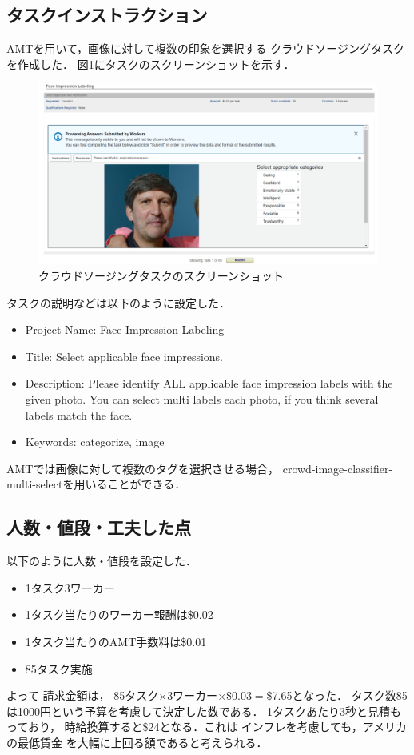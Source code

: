 \subsection{タスクインストラクション}
AMTを用いて，画像に対して複数の印象を選択する
クラウドソージングタスクを作成した．
図\ref{fig:ch2:task}にタスクのスクリーンショットを示す．
\begin{figure}[tb]
  \centering
  \includegraphics[width=12cm]{ch2/task.png}
  \caption{
  クラウドソージングタスクのスクリーンショット
  \label{fig:ch2:task}
  }
\end{figure}
タスクの説明などは以下のように設定した．
\begin{itemize}
  \item Project Name: Face Impression Labeling
  \item Title: Select applicable face impressions.
  \item Description: Please identify ALL applicable
  face impression labels with the given photo.
  You can select multi labels each photo, if you
  think several labels match the face.
  \item Keywords: categorize, image
\end{itemize}

AMTでは画像に対して複数のタグを選択させる場合，
crowd-image-classifier-multi-selectを用いることができる．

\subsection{人数・値段・工夫した点}
以下のように人数・値段を設定した．
\begin{itemize}
  \item 1タスク3ワーカー
  \item 1タスク当たりのワーカー報酬は\$0.02
  \item 1タスク当たりのAMT手数料は\$0.01
  \item 85タスク実施
\end{itemize}
よって
請求金額は，
85タスク$\times$3ワーカー$\times$\$0.03$=$\$7.65となった．
タスク数85は1000円という予算を考慮して決定した数である．
1タスクあたり3秒と見積もっており，
時給換算すると\$24となる．これは
インフレを考慮しても，アメリカの最低賃金
を大幅に上回る額であると考えられる．

